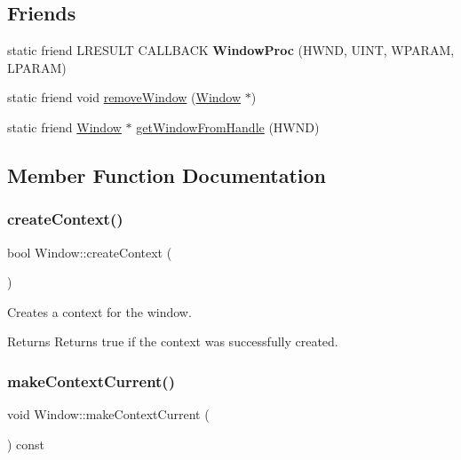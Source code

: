 \subsection*{Friends}
\begin{DoxyCompactItemize}
\item 
\mbox{\label{class_window_afe803be2ab51884970c2a5bf9dfa61b0}} 
static friend L\+R\+E\+S\+U\+LT C\+A\+L\+L\+B\+A\+CK {\bfseries Window\+Proc} (H\+W\+ND, U\+I\+NT, W\+P\+A\+R\+AM, L\+P\+A\+R\+AM)
\item 
static friend void \mbox{\hyperlink{class_window_a893ed9ae2158e583c7bac06deddc8bb3}{remove\+Window}} (\mbox{\hyperlink{class_window}{Window}} $\ast$)
\item 
static friend \mbox{\hyperlink{class_window}{Window}} $\ast$ \mbox{\hyperlink{class_window_aca83cc9021e3e6075031093398621437}{get\+Window\+From\+Handle}} (H\+W\+ND)
\end{DoxyCompactItemize}


\subsection{Member Function Documentation}
\mbox{\label{class_window_ae8f88271d37b496acde43280b8e7d99c}} 
\subsubsection{\texorpdfstring{create\+Context()}{createContext()}}
{\footnotesize\ttfamily bool Window\+::create\+Context (\begin{DoxyParamCaption}{ }\end{DoxyParamCaption})\hspace{0.3cm}{\ttfamily [noexcept]}}

Creates a context for the window.

\begin{DoxyReturn}{Returns}
Returns true if the context was successfully created. 
\end{DoxyReturn}
\mbox{\label{class_window_ab217dfd20f30652a98647fec702a55a5}} 
\subsubsection{\texorpdfstring{make\+Context\+Current()}{makeContextCurrent()}}
{\footnotesize\ttfamily void Window\+::make\+Context\+Current (\begin{DoxyParamCaption}{ }\end{DoxyParamCaption}) const\hspace{0.3cm}{\ttfamily [noexcept]}}

